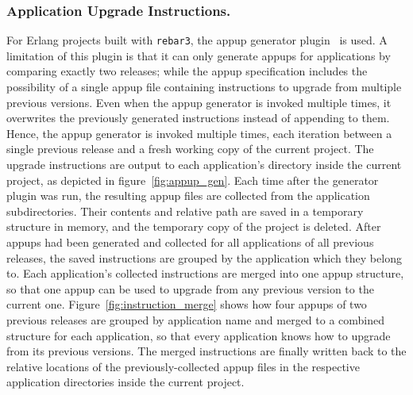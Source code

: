 {\subsubsection{Application Upgrade Instructions.} For Erlang projects built with \lstinline|rebar3|, the \acrlong{appup} generator plugin~\cite{rebar3appup} is used. A limitation of this plugin is that it can only generate \acrshort{appup}s for applications by comparing exactly two releases; while the \acrshort{appup} specification includes the possibility of a single \acrshort{appup} file containing instructions to upgrade from multiple previous versions. Even when the \acrshort{appup} generator is invoked multiple times, it overwrites the previously generated instructions instead of appending to them. Hence, the \acrshort{appup} generator is invoked multiple times, each iteration between a single previous release and a fresh working copy of the current project. The upgrade instructions are output to each application's directory inside the current project, as depicted in figure~\ref{fig:appup_gen}. Each time after the generator plugin was run, the resulting \acrshort{appup} files are collected from the application subdirectories. Their contents and relative path are saved in a temporary structure in memory, and the temporary copy of the project is deleted. After \acrshort{appup}s had been generated and collected for all applications of all previous releases, the saved instructions are grouped by the application which they belong to. Each application's collected instructions are merged into one \acrshort{appup} structure, so that one \acrshort{appup} can be used to upgrade from any previous version to the current one. Figure~\ref{fig:instruction_merge} shows how four \acrshort{appup}s of two previous releases are grouped by application name and merged to a combined structure for each application, so that every application knows how to upgrade from its previous versions. The merged instructions are finally written back to the relative locations of the previously-collected \acrshort{appup} files in the respective application directories inside the current project.


}
